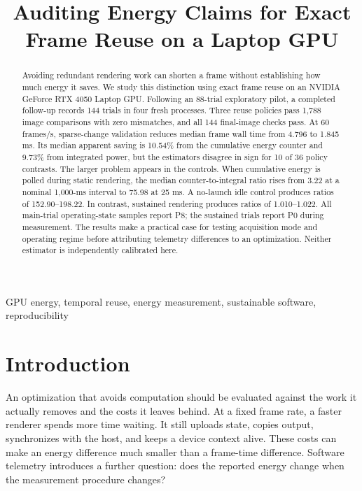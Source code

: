 \documentclass[10pt,conference]{IEEEtran}
\begin{document}
\title{Auditing Energy Claims for Exact Frame Reuse on a Laptop GPU}
\author{
}
\maketitle

\begin{abstract}
Avoiding redundant rendering work can shorten a frame without establishing how much energy it saves. We study this distinction using exact frame reuse on an NVIDIA GeForce RTX 4050 Laptop GPU. Following an 88-trial exploratory pilot, a completed follow-up records 144 trials in four fresh processes. Three reuse policies pass 1,788 image comparisons with zero mismatches, and all 144 final-image checks pass. At 60 frames/s, sparse-change validation reduces median frame wall time from 4.796 to 1.845 ms. Its median apparent saving is 10.54\% from the cumulative energy counter and 9.73\% from integrated power, but the estimators disagree in sign for 10 of 36 policy contrasts. The larger problem appears in the controls. When cumulative energy is polled during static rendering, the median counter-to-integral ratio rises from 3.22 at a nominal 1,000-ms interval to 75.98 at 25 ms. A no-launch idle control produces ratios of 152.90--198.22. In contrast, sustained rendering produces ratios of 1.010--1.022. All main-trial operating-state samples report P8; the sustained trials report P0 during measurement. The results make a practical case for testing acquisition mode and operating regime before attributing telemetry differences to an optimization. Neither estimator is independently calibrated here.
\end{abstract}
\begin{IEEEkeywords}
GPU energy, temporal reuse, energy measurement, sustainable software, reproducibility
\end{IEEEkeywords}

\section{Introduction}
An optimization that avoids computation should be evaluated against the work it actually removes and the costs it leaves behind. At a fixed frame rate, a faster renderer spends more time waiting. It still uploads state, copies output, synchronizes with the host, and keeps a device context alive. These costs can make an energy difference much smaller than a frame-time difference. Software telemetry introduces a further question: does the reported energy change when the measurement procedure changes?
\end{document}

